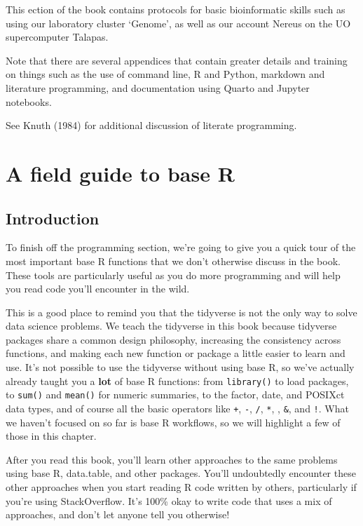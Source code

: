 \documentclass[
  letterpaper,
  DIV=11,
  numbers=noendperiod]{scrreprt}
\begin{document}
This ection of the book contains protocols for basic bioinformatic
skills such as using our laboratory cluster `Genome', as well as our
account Nereus on the UO supercomputer Talapas.

Note that there are several appendices that contain greater details and
training on things such as the use of command line, R and Python,
markdown and literature programming, and documentation using Quarto and
Jupyter notebooks.

See Knuth (1984) for additional discussion of literate programming.

\hypertarget{sec-bioinfor-base_r}{%
\chapter{A field guide to base R}\label{sec-bioinfor-base_r}}

\hypertarget{introduction-112}{%
\section{Introduction}\label{introduction-112}}

To finish off the programming section, we're going to give you a quick
tour of the most important base R functions that we don't otherwise
discuss in the book. These tools are particularly useful as you do more
programming and will help you read code you'll encounter in the wild.

This is a good place to remind you that the tidyverse is not the only
way to solve data science problems. We teach the tidyverse in this book
because tidyverse packages share a common design philosophy, increasing
the consistency across functions, and making each new function or
package a little easier to learn and use. It's not possible to use the
tidyverse without using base R, so we've actually already taught you a
\textbf{lot} of base R functions: from \texttt{library()} to load
packages, to \texttt{sum()} and \texttt{mean()} for numeric summaries,
to the factor, date, and POSIXct data types, and of course all the basic
operators like \texttt{+}, \texttt{-}, \texttt{/}, \texttt{*},
\texttt{\textbar{}}, \texttt{\&}, and \texttt{!}. What we haven't
focused on so far is base R workflows, so we will highlight a few of
those in this chapter.

After you read this book, you'll learn other approaches to the same
problems using base R, data.table, and other packages. You'll
undoubtedly encounter these other approaches when you start reading R
code written by others, particularly if you're using StackOverflow. It's
100\% okay to write code that uses a mix of approaches, and don't let
anyone tell you otherwise!
\end{document}
